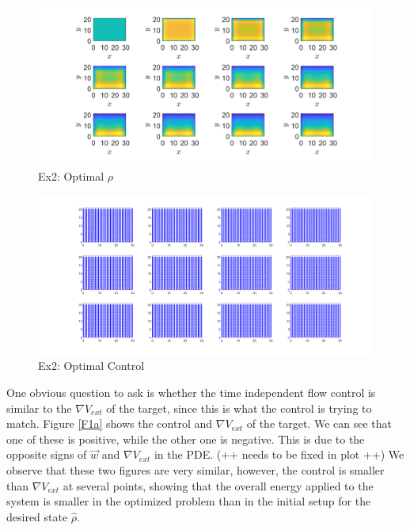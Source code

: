 \documentclass[final]{siamltex}
\newcommand{\w}{\vec{w}}
\newcommand{\hr}{\widehat \rho}
\begin{document}
\begin{figure}[h]
	\centering
	\includegraphics[scale=0.25]{C2.png}
	\caption{Ex2: Optimal $\rho$} 
	\label{F7a}
\end{figure}
\begin{figure}[h]
	\centering
	\includegraphics[scale=0.25]{C3.png}
	\caption{Ex2: Optimal Control} 
	\label{F8a}
\end{figure}

One obvious question to ask is whether the time independent flow control is similar to the $\nabla V_{ext}$ of the target, since this is what the control is trying to match. Figure \ref{F1a} shows the control and $\nabla V_{ext}$ of the target. We can see that one of these is positive, while the other one is negative. This is due to the opposite signs of $\w$ and $\nabla V_{ext}$ in the PDE. (++ needs to be fixed in plot ++) We observe that these two figures are very similar, however, the control is smaller than $\nabla V_{ext}$ at several points, showing that the overall energy applied to the system is smaller in the optimized problem than in the initial setup for the desired state $\hr$.
\end{document}
